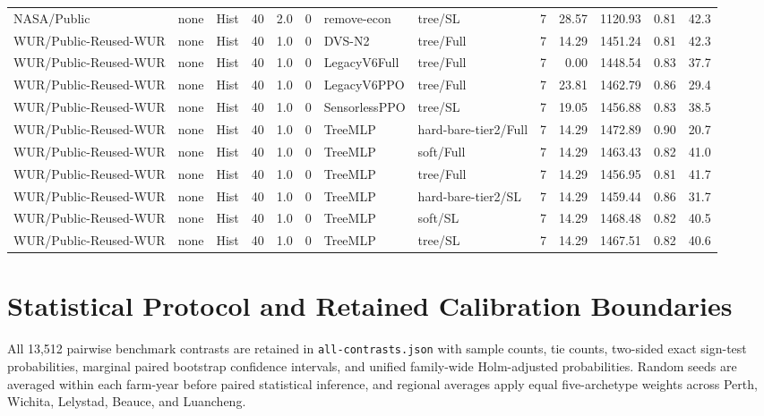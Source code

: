 \documentclass[10pt,a4paper]{article}
\begin{document}
\begin{landscape}
\begin{longtable}{llllllllrrrrr}
NASA/Public & none & Hist & 40 & 2.0 & 0 & remove-econ & tree/SL & 7 & 28.57 & 1120.93 & 0.81 & 42.3 \\

WUR/Public-Reused-WUR & none & Hist & 40 & 1.0 & 0 & DVS-N2 & tree/Full & 7 & 14.29 & 1451.24 & 0.81 & 42.3 \\

WUR/Public-Reused-WUR & none & Hist & 40 & 1.0 & 0 & LegacyV6Full & tree/Full & 7 & 0.00 & 1448.54 & 0.83 & 37.7 \\

WUR/Public-Reused-WUR & none & Hist & 40 & 1.0 & 0 & LegacyV6PPO & tree/Full & 7 & 23.81 & 1462.79 & 0.86 & 29.4 \\

WUR/Public-Reused-WUR & none & Hist & 40 & 1.0 & 0 & SensorlessPPO & tree/SL & 7 & 19.05 & 1456.88 & 0.83 & 38.5 \\

WUR/Public-Reused-WUR & none & Hist & 40 & 1.0 & 0 & TreeMLP & hard-bare-tier2/Full & 7 & 14.29 & 1472.89 & 0.90 & 20.7 \\

WUR/Public-Reused-WUR & none & Hist & 40 & 1.0 & 0 & TreeMLP & soft/Full & 7 & 14.29 & 1463.43 & 0.82 & 41.0 \\

WUR/Public-Reused-WUR & none & Hist & 40 & 1.0 & 0 & TreeMLP & tree/Full & 7 & 14.29 & 1456.95 & 0.81 & 41.7 \\

WUR/Public-Reused-WUR & none & Hist & 40 & 1.0 & 0 & TreeMLP & hard-bare-tier2/SL & 7 & 14.29 & 1459.44 & 0.86 & 31.7 \\

WUR/Public-Reused-WUR & none & Hist & 40 & 1.0 & 0 & TreeMLP & soft/SL & 7 & 14.29 & 1468.48 & 0.82 & 40.5 \\

WUR/Public-Reused-WUR & none & Hist & 40 & 1.0 & 0 & TreeMLP & tree/SL & 7 & 14.29 & 1467.51 & 0.82 & 40.6 \\

\bottomrule\end{longtable}\end{landscape}

\clearpage\section{Statistical Protocol and Retained Calibration Boundaries}

All 13,512 pairwise benchmark contrasts are retained in \texttt{all-contrasts.json} with sample counts, tie counts, two-sided exact sign-test probabilities, marginal paired bootstrap confidence intervals, and unified family-wide Holm-adjusted probabilities. Random seeds are averaged within each farm-year before paired statistical inference, and regional averages apply equal five-archetype weights across Perth, Wichita, Lelystad, Beauce, and Luancheng.
\end{document}
